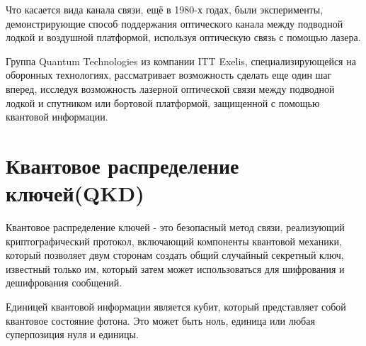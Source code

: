 \documentclass[a4paper,12pt]{article} %
\begin{document}
Что касается вида канала связи, ещё в 1980-х годах, были эксперименты, демонстрирующие способ поддержания оптического канала между подводной лодкой и воздушной платформой, используя оптическую связь с помощью лазера.

Группа Quantum Technologies из компании ITT Exelis, специализирующейся на оборонных технологиях, рассматривает возможность сделать еще один шаг вперед, исследуя возможность лазерной оптической связи между подводной лодкой и спутником или бортовой платформой, защищенной с помощью квантовой информации.

\section*{Квантовое распределение ключей(QKD)}

\hspace{13pt} Квантовое распределение ключей - это безопасный метод связи, реализующий криптографический протокол, включающий компоненты квантовой механики, который позволяет двум сторонам создать общий случайный секретный ключ, известный только им, который затем может использоваться для шифрования и дешифрования сообщений.

Единицей квантовой информации является кубит, который представляет собой квантовое состояние фотона. Это может быть ноль, единица или любая суперпозиция нуля и единицы.

~\\~

\noindent%
\begin{minipage}{\linewidth}%
\label{SVM}%
\end{minipage}
\end{document}
